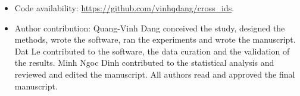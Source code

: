\documentclass[pdflatex,sn-mathphys-num]{sn-jnl}%
\begin{document}
\begin{itemize}
\item Code availability: \url{https://github.com/vinhqdang/cross_ids}.
\item Author contribution: Quang-Vinh Dang conceived the study, designed the methods, wrote the software, ran the experiments and wrote the manuscript. Dat Le contributed to the software, the data curation and the validation of the results. Minh Ngoc Dinh contributed to the statistical analysis and reviewed and edited the manuscript. All authors read and approved the final manuscript.
\end{itemize}


\end{document}
